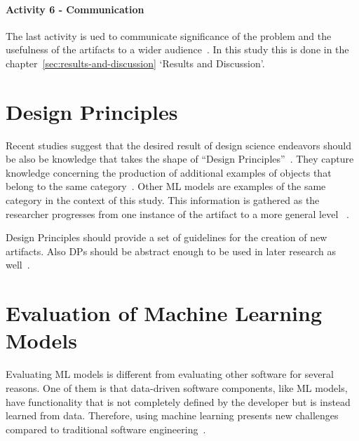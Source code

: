 \paragraph{Activity 6 - Communication}
The last activity is ued to communicate significance of the problem and the usefulness of the artifacts to a wider
audience~\cite[p. 56]{peffers_designscienceresearch_2007}.
In this study this is done in the chapter~\ref{sec:results-and-discussion} `Results and Discussion'.


\section{Design Principles}\label{sec:design-principles}


Recent studies suggest that the desired result of design science endeavors should be also be knowledge that takes the
shape of
``Design Principles''~\cite{baskerville2010explanatory, sein2011action, gregor_positioningpresentingdesign_2013}.
They capture knowledge concerning the production of additional examples of objects that belong to the same
category~\cite[p. 39]{sein2011action}.
Other ML models are examples of the same category in the context of this study.
This information is gathered as the researcher progresses from one instance of the artifact to a more general level
~\cite[p. 37]{chandra2016making}.

Design Principles should provide a set of guidelines for the creation of new artifacts.
Also DPs should be abstract enough to be used in later research as well~\cite[p. 37]{sein2011action}.


\section{Evaluation of Machine Learning Models}\label{sec:evaluation-of-machine-learning-models}
Evaluating \ac{ML} models is different from evaluating other software for several reasons.
One of them is that data-driven software components, like \ac{ML} models, have functionality that
is not completely defined by the developer but is instead learned from data.
Therefore, using machine learning presents new challenges compared to traditional software
engineering~\cite[p. 2]{siebert2022construction}.

